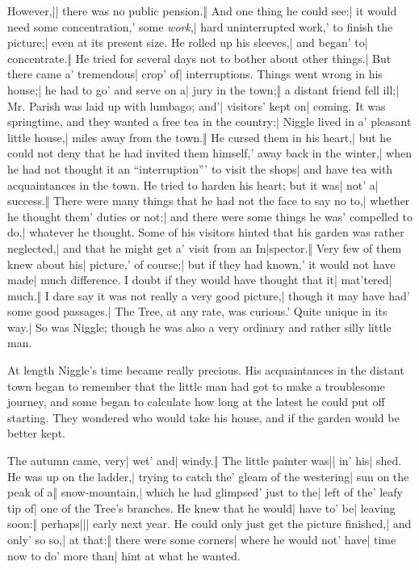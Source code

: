 \begin{itemize}
\halftwo However,|| there was no public pension.‖ And one thing he could see:| it would need some concentration,' some \emph{work},| hard uninterrupted work,' to finish the picture;| even at its present size.
\halfone He rolled up his sleeves,| and began' to| concentrate.‖ He tried for several days not to bother about other things.| But there came a' tremendous| crop' of| interruptions.
\halftwo Things went wrong in his house;| he had to go' and serve on a| jury in the town;‖ a distant friend fell ill;| Mr. Parish was laid up with lumbago; and'| visitors' kept on| coming.
\halfone It was springtime, and they wanted a free tea in the country:| Niggle lived in a' pleasant little house,| miles away from the town.‖ He cursed them in his heart,| but he could not deny that he had invited them himself,' away back in the winter,| when he had not thought it an “interruption”' to visit the shops| and have tea with acquaintances in the town.
\halftwo He tried to harden his heart; but it was| not' a| success.‖ There were many things that he had not the face to say no to,| whether he thought them' duties or not;| and there were some things he was' compelled to do,| whatever he thought.
\halfone Some of his visitors hinted that his garden was rather neglected,| and that he might get a' visit from an In|spector.‖ Very few of them knew about his| picture,' of course;| but if they had known,' it would not have made| much difference.
\halftwo I doubt if they would have thought that it| mat'tered| much.‖ I dare say it was not really a very good picture,| though it may have had' some good passages.| The Tree, at any rate, was curious.' Quite unique in its way.| So was Niggle; though he was also a very ordinary and rather silly little man.
\end{itemize}

At length Niggle’s time became really precious. His acquaintances in the distant town began to remember that the little man had got to make a troublesome journey, and some began to calculate how long at the latest he could put off starting. They wondered who would take his house, and if the garden would be better kept.


\begin{itemize}
\halfone The autumn came, very| wet' and| windy.‖ The little painter was|| in' his| shed.
\halftwo He was up on the ladder,| trying to catch the' gleam of the westering| sun on the peak of a‖ snow-mountain,| which he had glimpsed' just to the| left of the' leafy tip of| one of the Tree’s branches.
\halfone He knew that he would| have to' be| leaving soon:‖ perhaps||| early next year.
\halftwo He could only just get the picture finished,| and only' so so,| at that:‖ there were some corners| where he would not' have| time now to do' more than| hint at what he wanted.
\end{itemize}

